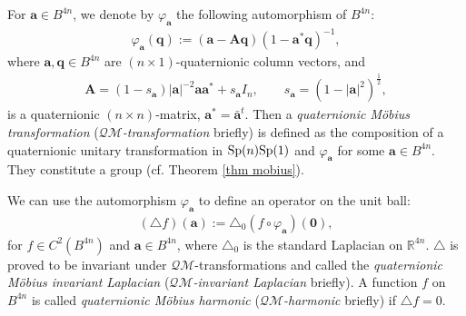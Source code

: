 \documentclass[a4paper,11pt]{amsart}
\numberwithin{equation}{section}
\begin{document}
 For $\mathbf{a}\in B^{4n}$, we denote by $\varphi_{\mathbf{a}}$ the following automorphism of $B^{4n}$:
\begin{equation}\begin{aligned}\label{def varphib}
\varphi_{\mathbf{a}}(\mathbf{q}):=(\mathbf{a}-\mathbf{A}\mathbf{q})(1-\mathbf{a}^*\mathbf{q})^{-1},
\end{aligned}\end{equation}
where $\mathbf{a},\mathbf{q}\in B^{4n}$ are $(n\times 1)$-quaternionic column vectors, and
\begin{equation}\begin{aligned}\label{hermitian}
\mathbf{A}=(1-s_{\mathbf{a}})|\mathbf{a}|^{-2}\mathbf{a}\mathbf{a}^*+s_{\mathbf{a}}I_n,\qquad s_{\mathbf{a}}=(1-|\mathbf{a}|^2)^{\frac12},
\end{aligned}\end{equation}
is a quaternionic $(n\times n)$-matrix, $\mathbf{a}^*=\bar{\mathbf{a}}^t$. Then a \emph{quaternionic M\"{o}bius transformation} ({\it $\mathcal{QM}$-transformation } briefly) is defined as the composition of a quaternionic unitary transformation in ${\rm Sp}(n){\rm Sp}(1)$ and $\varphi_{\mathbf{a}}$ for some $\mathbf{a}\in B^{4n}$. They constitute a group (cf. Theorem \ref{thm mobius}).

We can use the automorphism $\varphi_{\mathbf{a}}$ to define an operator on the unit ball:
\begin{equation}\begin{aligned}\label{def inv op}
(\triangle f)(\mathbf{a}):=\triangle_0(f\circ \varphi_{\mathbf{a}})(\mathbf{0}),
\end{aligned}\end{equation}
for $f\in C^2(B^{4n})$ and $\mathbf{a}\in B^{4n}$, where $\triangle_0$ is the standard Laplacian on $\mathbb{R}^{4n}$. $\triangle$ is proved to be invariant under $\mathcal{QM}$-transformations and called the \emph{quaternionic M\"{o}bius invariant Laplacian} ({\it $\mathcal{QM}$-invariant Laplacian} briefly). A function $f$ on $B^{4n}$ is called \emph{quaternionic M\"{o}bius harmonic} ({\it $\mathcal{QM}$-harmonic} briefly) if $\triangle f=0$.
\end{document}
